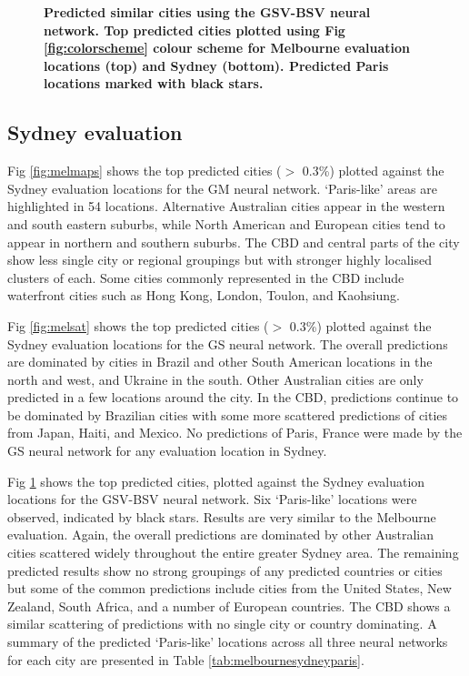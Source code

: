 \documentclass[Crown,sageh,times]{sagej}
\begin{document}
\begin{figure}[!htbp]
\caption{\bf Predicted similar cities using the GSV-BSV neural network. Top predicted cities plotted using Fig \ref{fig:colorscheme} colour scheme for Melbourne evaluation locations (top) and Sydney (bottom). Predicted Paris locations marked with black stars.}   
 \label{fig:melstreet}  
\end{figure}



\subsection{Sydney evaluation} 

Fig \ref{fig:melmaps} shows the top predicted cities ($>$ 0.3\%) plotted against the Sydney evaluation locations for the GM neural network. `Paris-like' areas are highlighted in 54 locations.  Alternative Australian cities appear in the western and south eastern suburbs, while North American and European cities tend to appear in northern and southern suburbs. The CBD and central parts of the city show less single city or regional groupings but with stronger highly localised clusters of each. Some cities commonly represented in the CBD include waterfront cities such as Hong Kong, London, Toulon, and Kaohsiung. 

Fig \ref{fig:melsat} shows the top predicted cities ($>$ 0.3\%) plotted against the Sydney evaluation locations for the GS neural network. The overall predictions are dominated by cities in Brazil and other South American locations in the north and west, and Ukraine in the south. Other Australian cities are only predicted in a few locations around the city. In the CBD, predictions continue to be dominated by Brazilian cities with some more scattered predictions of cities from Japan, Haiti, and Mexico. No predictions of Paris, France were made by the GS neural network for any evaluation location in Sydney.

Fig \ref{fig:melstreet} shows the top predicted cities, plotted against the Sydney evaluation locations for the GSV-BSV neural network. Six `Paris-like' locations were observed, indicated by black stars. Results are very similar to the Melbourne evaluation. Again, the overall predictions are dominated by other Australian cities scattered widely throughout the entire greater Sydney area. The remaining predicted results show no strong groupings of any predicted countries or cities but some of the common predictions include cities from the United States, New Zealand, South Africa, and a number of European countries. The CBD shows a similar scattering of predictions with no single city or country dominating. A summary of the predicted `Paris-like' locations across all three neural networks for each city are presented in Table \ref{tab:melbournesydneyparis}.
\end{document}
